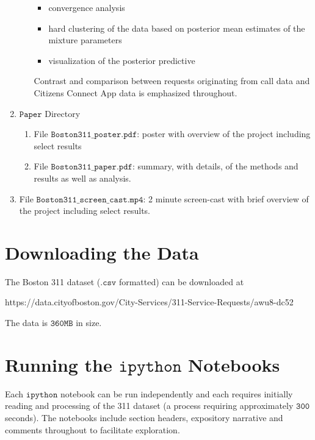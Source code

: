 \documentclass{article}
\theoremstyle{theorem}
\theoremstyle{theorem}
\theoremstyle{theorem}
\theoremstyle{lemma}
\theoremstyle{definition}
\theoremstyle{example}
\begin{document}
\begin{enumerate}
\begin{enumerate}
\begin{itemize}
\item convergence analysis
\item hard clustering of the data based on posterior mean estimates of the mixture parameters
\item visualization of the posterior predictive 
\end{itemize}
Contrast and comparison between requests originating from call data and Citizens Connect App data is emphasized throughout.
\end{enumerate}
\item $\texttt{Paper}$ Directory
\begin{enumerate}
\item File $\texttt{Boston311\_poster.pdf}$: poster with overview of the project including select results
\item File $\texttt{Boston311\_paper.pdf}$: summary, with details, of the methods and results as well as analysis. 
\end{enumerate}
\item File $\texttt{Boston311\_screen\_cast.mp4}$: 2 minute screen-cast with brief overview of the project including select results.
\end{enumerate}

\section{Downloading the Data}
The Boston 311 dataset ($\texttt{.csv}$ formatted) can be downloaded at
\begin{center}
https://data.cityofboston.gov/City-Services/311-Service-Requests/awu8-dc52
\end{center}
The data is $\mathtt{360MB}$ in size.
\section{Running the $\texttt{ipython}$ Notebooks}
Each $\texttt{ipython}$ notebook can be run independently and each requires initially reading and processing of the 311 dataset (a process requiring approximately $\mathtt{300}$ seconds). The notebooks include section headers, expository narrative and comments throughout to facilitate exploration. 
\end{document}
